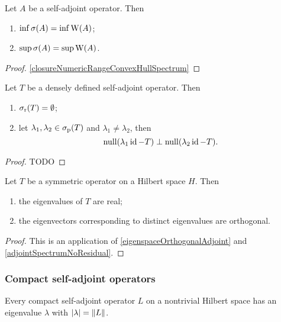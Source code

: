 \begin{proposition}
Let $A$ be a self-adjoint operator. Then
\begin{enumerate}
\item $\inf \sigma(A) = \inf\operatorname{W}(A)$;
\item $\sup \sigma(A) = \sup\operatorname{W}(A)$.
\end{enumerate}
\end{proposition}
\begin{proof}
\ref{closureNumericRangeConvexHullSpectrum}
\end{proof}

\begin{proposition}
Let $T$ be a densely defined self-adjoint operator. Then
\begin{enumerate}
\item $\sigma_\text{r}(T) = \emptyset$;
\item let $\lambda_1,\lambda_2 \in \sigma_\text{p}(T)$ and $\lambda_1\neq \lambda_2$, then 
\[ \operatorname{null}(\lambda_1\operatorname{id} - T) \perp \operatorname{null}(\lambda_2 \operatorname{id} - T). \]
\end{enumerate}
\end{proposition}
\begin{proof}
TODO
\end{proof}


\begin{proposition}
Let $T$ be a symmetric operator on a Hilbert space $H$. Then
\begin{enumerate}
\item the eigenvalues of $T$ are real;
\item the eigenvectors corresponding to distinct eigenvalues are orthogonal.
\end{enumerate}
\end{proposition}
\begin{proof}
This is an application of \ref{eigenspaceOrthogonalAdjoint} and \ref{adjointSpectrumNoResidual}.
\end{proof}

\subsubsection{Compact self-adjoint operators}
\begin{proposition}
Every compact self-adjoint operator $L$ on a nontrivial Hilbert space has an eigenvalue $\lambda$ with $|\lambda| = \lVert L\rVert$.
\end{proposition}

